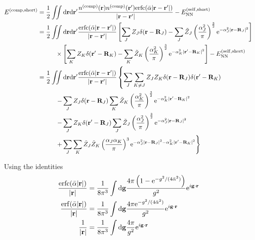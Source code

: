 \documentclass[paper=a4, fontsize=11pt]{article} %
\numberwithin{equation}{section} %
\numberwithin{figure}{section} %
\numberwithin{table}{section} %
\newcommand{\bg}{{\bf{g}}}
\newcommand{\br}{{\bf{r}}}
\newcommand{\bR}{{\bf{R}}}
\newcommand{\rNN}{{\mathrm{NN}}}
\newcommand{\rself}{{\mathrm{self}}}
\newcommand{\re}{{\mathrm{e}}}
\newcommand{\rshort}{{\mathrm{short}}}
\newcommand{\rerf}{{\mathrm{erf}}}
\newcommand{\rerfc}{{\mathrm{erfc}}}
\newcommand{\rd}{{\mathrm{d}}}
\newcommand{\rcomp}{{\mathrm{comp}}}
\newcommand{\al}{{\alpha}}
\begin{document}
\begin{equation}
\begin{split}
E^{(\rcomp,\rshort)} 
&= \frac{1}{2}\iint \rd \br \rd \br' \frac{n^{(\rcomp)}(\br)n^{(\rcomp)}(\br')\rerfc(\bar {\al}|\br-\br'|)}{|\br-\br'|} - E_{\rNN}^{(\rself,\rshort)}\\
&= \frac{1}{2}\iint \rd \br \rd \br' \frac{\rerfc(\bar {\al}|\br-\br'|)}{|\br-\br'|} \left[\sum_J Z_J\delta(\br-\bR_J) - \sum_J \tilde Z_J\left(\frac{\al_J^2}{\pi}\right)^{\frac{3}{2}}\re^{-\al_J^2|\br-\bR_J|^2}\right]\\
&\hspace{10mm}\times \left[\sum_K Z_K\delta(\br'-\bR_K) - \sum_K \tilde Z_K\left(\frac{\al_K^2}{\pi}\right)^{\frac{3}{2}}\re^{-\al_K^2|\br'-\bR_K|^2}\right] - E_{\rNN}^{(\rself,\rshort)}\\
&= \frac{1}{2}\iint \rd \br \rd \br' \frac{\rerfc(\bar {\al}|\br-\br'|)}{|\br-\br'|} \left\{\sum_J \sum_{K \neq J} Z_J Z_K \delta(\br-\bR_J)\delta(\br'-\bR_K) \right. \\
&\left.\hspace{10mm} - \sum_J Z_J\delta(\br-\bR_J) \sum_K \tilde Z_K\left(\frac{\al_K^2}{\pi}\right)^{\frac{3}{2}}\re^{-\al_K^2|\br'-\bR_K|^2} \right. \\
&\left.\hspace{10mm} - \sum_J Z_K\delta(\br'-\bR_J) \sum_J \tilde Z_J\left(\frac{\al_J^2}{\pi}\right)^{\frac{3}{2}}\re^{-\al_J^2|\br-\bR_J|^2} \right. \\
&\left.\hspace{10mm} + \sum_J\sum_K \tilde Z_J\tilde Z_K\left(\frac{\al_J\al_K}{\pi}\right)^3\re^{-\al_J^2|\br-\bR_J|^2-\al_K^2|\br'-\bR_K|^2}\right\}\\
\end{split}
\end{equation}

Using the identities 
\begin{equation}
\begin{split}
\frac{\rerfc(\bar {\al}|\br|)}{|\br|} &= \frac{1}{8\pi^3} \int \rd \bg \frac{4\pi \left(1-\re^{-g^2/(4\bar{\al}^2)}\right)}{g^2} \re^{i\bg\cdot \br} \\
\frac{\rerf(\bar {\al}|\br|)}{|\br|} &= \frac{1}{8\pi^3} \int \rd \bg \frac{4\pi \re^{-g^2/(4\bar{\al}^2)}}{g^2} \re^{i\bg\cdot \br}\\
\frac{1}{|\br|} &= \frac{1}{8\pi^3} \int \rd \bg \frac{4\pi}{g^2} \re^{i\bg\cdot \br}
\end{split}
\end{equation}
\end{document}
